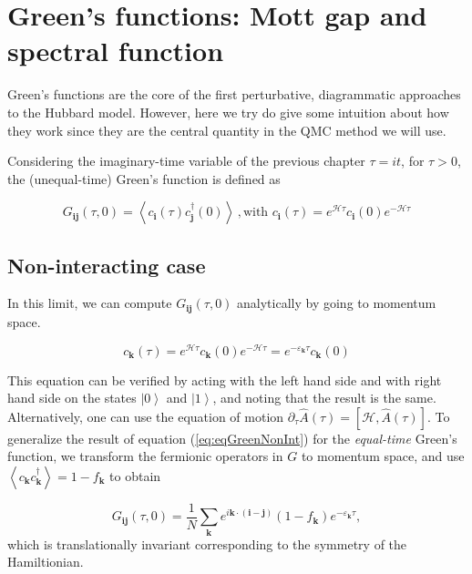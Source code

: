 \section{Green's functions: Mott gap and spectral function}\label{sec:green}

Green's functions are the core of the first perturbative, diagrammatic approaches to the Hubbard model.
However, here we try do give some intuition about how they work since they are the central quantity in the \acs{QMC} method we will use.

Considering the imaginary-time variable of the previous chapter $\tau = i t$, for $\tau > 0$, the (unequal-time) Green's function is defined as

\begin{equation}
G_{\bm i \bm j} ( \tau, 0 ) = \left\langle c_{\bm i} ( \tau ) c_{\bm j}^\dagger ( 0 ) \right\rangle  \, , \text{with} \,\, c_{\bm i} ( \tau ) = e^{\mathcal{H} \tau } c_{\bm i} ( 0 ) e^{- \mathcal{H} \tau } 
\end{equation}

\subsection{Non-interacting case}

In this limit, we can compute $G_{\bm i \bm j} ( \tau, 0 )$ analytically by going to momentum space.

\begin{equation}
c_{\bm k} ( \tau ) = e^{ \mathcal{H} \tau } c_{\bm k} ( 0 ) e^{-\mathcal{H} \tau } = e^{-\varepsilon_{\bm k} \tau } c_{\bm k} ( 0 )
\end{equation}

This equation can be verified by acting with the left hand side and with right hand side on the states $\left| 0 \right\rangle$ and $\left| 1 \right\rangle$, and noting that the result is the same.
Alternatively, one can use the equation of motion $\partial_\tau \hat{A}(\tau) = [ \mathcal{H}, \hat{A} (\tau) ]$.
To generalize the result of equation (\ref{eq:eqGreenNonInt}) for the \emph{equal-time} Green's function, we transform the fermionic operators in $G$ to momentum space, and use $\left\langle c_{\bm k} c_{\bm k}^\dagger \right\rangle = 1 - f_{\bm k}$ to obtain

\begin{equation}
G_{\bm i \bm j}(\tau, 0) = \frac{1}{N} \sum_{\bm k} e^{i \bm k \cdot (\bm i - \bm j )} ( 1 - f_{\bm k} ) e^{-\varepsilon_{\bm k} \tau } ,
\end{equation}
which is translationally invariant corresponding to the symmetry of the Hamiltionian.

